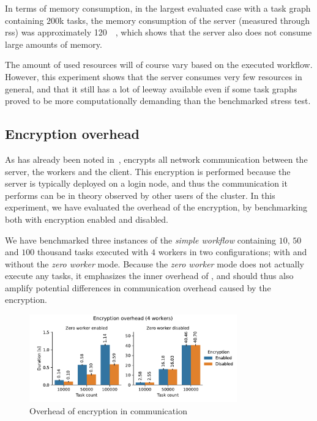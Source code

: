 In terms of memory consumption, in the largest evaluated case with a task graph containing
$200$k tasks, the memory consumption of the server (measured through
\gls{rss}) was approximately \SI{120}{\mebi\byte}, which shows that the server
also does not consume large amounts of memory.

The amount of used resources will of course vary based on the executed workflow. However, this
experiment shows that the server consumes very few resources in general, and that it still has a
lot of leeway available even if some task graphs proved to be more computationally demanding than
the benchmarked stress test.

\subsection{Encryption overhead}
\label{sec:hq-exp-encryption-overhead}
As has already been noted in~, \hyperqueue{} encrypts all network
communication between the server, the workers and the client. This encryption is performed because
the server is typically deployed on a login node, and thus the communication it performs can be in
theory observed by other users of the cluster. In this experiment, we have evaluated the overhead
of the encryption, by benchmarking \hyperqueue{} both with encryption enabled and
disabled.

We have benchmarked three instances of the \emph{simple workflow} containing
$10$, $50$ and $100$ thousand tasks
executed with $4$ \hyperqueue{} workers in two configurations; with
and without the \emph{zero worker} mode. Because the \emph{zero worker} mode does not
actually execute any tasks, it emphasizes the inner overhead of \hyperqueue{}, and should
thus also amplify potential differences in communication overhead caused by the encryption.

\begin{figure}[h]
	\centering
	\includegraphics[width=0.8\textwidth]{imgs/hq/charts/encryption-overhead}
	\caption{Overhead of encryption in \hyperqueue{} communication}
	\label{fig:hq-encryption-overhead}
\end{figure}

